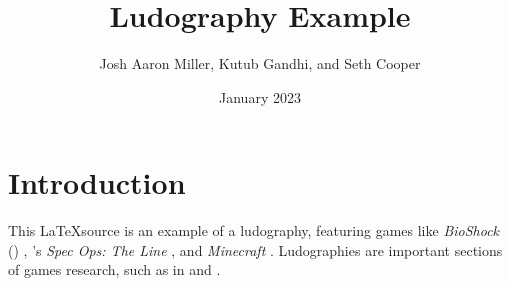 \documentclass[sigconf]{acmart}
\title{Ludography Example}
\author{Josh Aaron Miller, Kutub Gandhi, and Seth Cooper}
\date{January 2023}
\newcommand{\citegameprefix}{G}
\begin{document}
\maketitle

\section{Introduction}

This \LaTeX source is an example of a ludography, featuring games like \emph{BioShock} (\citeyear{bioshock}) , \citeauthor{specops}'s  \emph{Spec Ops: The Line} , and \emph{Minecraft} . Ludographies are important sections of games research, such as in \cite{gandhi_philosophy_2022} and \cite{poretski2022press}.



\renewcommand{\bibnumfmt}[1]{[\citegameprefix#1]}%

\renewcommand{\bibnumfmt}[1]{[#1]}%


\end{document}
